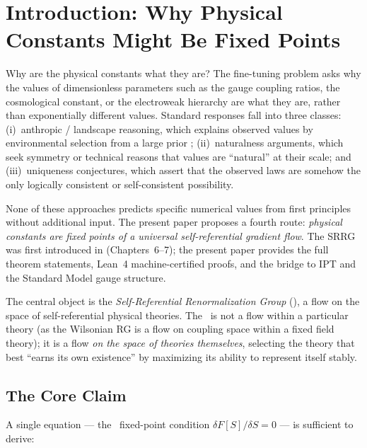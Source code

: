 \documentclass[11pt]{article}
\theoremstyle{remark}
\newcommand{\SRRG}{\text{SRRG}}
\begin{document}
\section{Introduction: Why Physical Constants Might Be Fixed Points}
\label{sec:intro}

Why are the physical constants what they are? The fine-tuning problem
\cite{Weinberg1987} asks why the values of dimensionless parameters such as the
gauge coupling ratios, the cosmological constant, or the electroweak hierarchy are
what they are, rather than exponentially different values. Standard responses
fall into three classes: (i)~anthropic / landscape reasoning, which explains
observed values by environmental selection from a large prior
\cite{Susskind2005}; (ii)~naturalness arguments, which seek symmetry
or technical reasons that values are ``natural'' at their scale; and
(iii)~uniqueness conjectures, which assert that the observed laws are somehow
the only logically consistent or self-consistent possibility.

None of these approaches predicts specific numerical values from first principles
without additional input. The present paper proposes a fourth route: \emph{physical
constants are fixed points of a universal self-referential gradient flow}.
The SRRG was first introduced in \cite{SpivackMathFoundationsSelfRef} (Chapters~6--7);
the present paper provides the full theorem statements, Lean~4 machine-certified proofs,
and the bridge to IPT and the Standard Model gauge structure.

The central object is the \emph{Self-Referential Renormalization Group} (\SRRG),
a flow on the space of self-referential physical theories. The \SRRG\ is not
a flow within a particular theory (as the Wilsonian RG is a flow on coupling
space within a fixed field theory); it is a flow \emph{on the space of theories
themselves}, selecting the theory that best ``earns its own existence'' by
maximizing its ability to represent itself stably.

\subsection{The Core Claim}

A single equation --- the \SRRG\ fixed-point condition
$\delta F[S]/\delta S = 0$ --- is sufficient to derive:
\end{document}
